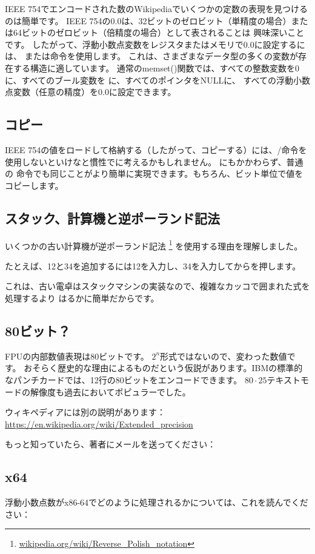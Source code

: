 IEEE 754でエンコードされた数のWikipediaでいくつかの定数の表現を見つけるのは簡単です。 
IEEE 754の0.0は、32ビットのゼロビット（単精度の場合）または64ビットのゼロビット（倍精度の場合）として表されることは
興味深いことです。
したがって、浮動小数点変数をレジスタまたはメモリで0.0に設定するには、 \MOV または命令を使用します。
これは、さまざまなデータ型の多くの変数が存在する構造に適しています。
通常のmemset()関数では、すべての整数変数を0に、すべてのブール変数を に、すべてのポインタをNULLに、
すべての浮動小数点変数（任意の精度）を0.0に設定できます。

\subsection{コピー}

IEEE 754の値をロードして格納する（したがって、コピーする）には、/命令を使用しないといけなと慣性でに考えるかもしれません。
にもかかわらず、普通の \MOV 命令でも同じことがより簡単に実現できます。もちろん、ビット単位で値をコピーします。

\subsection{スタック、計算機と逆ポーランド記法}


いくつかの古い計算機が逆ポーランド記法
\footnote{\href{http://go.yurichev.com/17354}{wikipedia.org/wiki/Reverse\_Polish\_notation}}
を使用する理由を理解しました。

たとえば、12と34を追加するには12を入力し、34を入力してからを押します。

これは、古い電卓はスタックマシンの実装なので、複雑なカッコで囲まれた式を処理するより
はるかに簡単だからです。

\subsection{80ビット？}

FPUの内部数値表現は80ビットです。
$2^n$形式ではないので、変わった数値です。
おそらく歴史的な理由によるものだという仮説があります。IBMの標準的なパンチカードでは、12行の80ビットをエンコードできます。 
$80\cdot 25$テキストモードの解像度も過去においてポピュラーでした。

ウィキペディアには別の説明があります：\url{https://en.wikipedia.org/wiki/Extended_precision}

もっと知っていたら、著者にメールを送ってください： \EMAIL{}

\subsection{x64}

浮動小数点数がx86-64でどのように処理されるかについては、これを読んでください：


